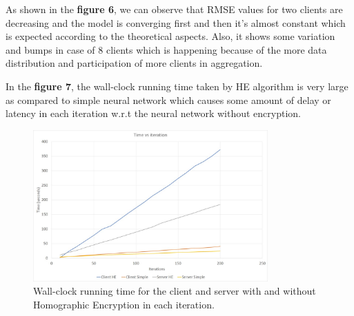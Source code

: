 \documentclass[conference]{IEEEtran}
\begin{document}
As shown in the \textbf{figure 6}, we can observe that RMSE values for two clients are decreasing and the model is converging first and then it's almost constant which is expected according to the theoretical aspects. Also, it shows some variation and bumps in case of 8 clients which is happening because of the more data distribution and participation of more clients in aggregation.

\vspace{\baselineskip}

In the \textbf{figure 7}, the wall-clock running time taken by HE algorithm is very large as compared to simple neural network which causes some amount of delay or latency in each iteration w.r.t the neural network without encryption.

\begin{figure}

\vspace{\baselineskip}


\includegraphics[width=90mm,scale=0.7]{Time_HE.jpeg}
\caption{ Wall-clock running time for the client and server with and without Homographic Encryption in each iteration.}

\end{figure}
\end{document}

